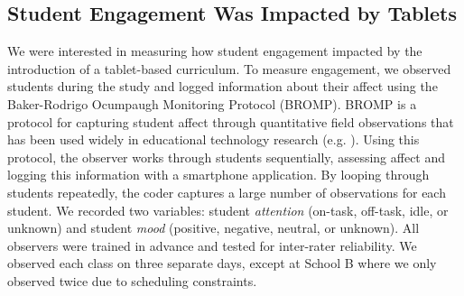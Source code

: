 \documentclass{sigchi}
\begin{document}
%






\subsection{Student Engagement Was Impacted by Tablets}
We were interested in measuring how student engagement impacted by the introduction of a tablet-based curriculum. To measure engagement, we observed students during the study and logged information about their affect using the Baker-Rodrigo Ocumpaugh Monitoring Protocol (BROMP). BROMP is a protocol for capturing student affect through quantitative field observations \cite{Ocumpaugh15} that has been used widely in educational technology research (e.g. \cite{Baker04, Pardos13}). Using this protocol, the observer works through students sequentially, assessing affect and logging this information with a smartphone application. By looping through students repeatedly, the coder captures a large number of observations for each student. We recorded two variables: student \emph{attention} (on-task, off-task, idle, or unknown) and student \emph{mood} (positive, negative, neutral, or unknown). All observers were trained in advance and tested for inter-rater reliability. We observed each class on three separate days, except at School B where we only observed twice due to scheduling constraints.
\end{document}
